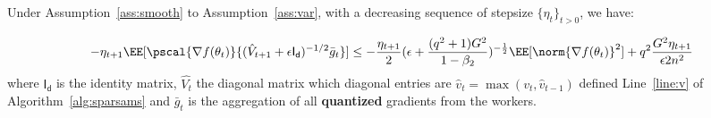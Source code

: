 \documentclass[11pt]{article}
\begin{document}
\begin{Lemma*}
Under Assumption~\ref{ass:smooth} to Assumption~\ref{ass:var}, with a decreasing sequence of stepsize $\{\eta_t\}_{t>0}$, we have:

\begin{equation}
-\eta_{t+1}\EE[\pscal{\nabla f(\theta_t)}{(\hat{V}_{t+1} + \epsilon \mathsf{I_d})^{-1/2} \bar{g}_t}] \leq - \frac{\eta_{t+1}}{2}  (\epsilon + \frac{(q^2+1)G^2}{1 - \beta_2})^{-\frac{1}{2}} \EE[\norm{\nabla f(\theta_t)}^2] +q^2 \frac{G^2 \eta_{t+1}}{\epsilon 2n^2}
\end{equation}
where $ \mathsf{I_d}$ is the identity matrix, $\hat{V_t}$ the diagonal matrix which diagonal entries are $\hat v_t=\max(v_t,\hat v_{t-1})$ defined Line~\ref{line:v} of Algorithm~\ref{alg:sparsams} and $\bar{g}_t$ is the aggregation of all \textbf{quantized} gradients from the workers.
\end{Lemma*}
\end{document}
